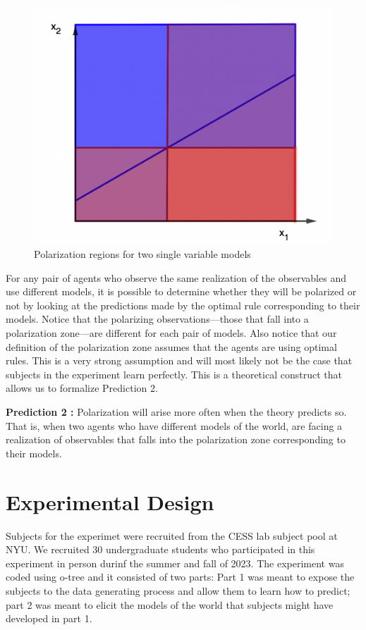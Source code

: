 \documentclass[
  12pt,
]{article}
\begin{document}
\begin{figure}

{\centering \includegraphics[width=0.5\linewidth]{../diagram_polariazation_2variables} 

}

\caption{\label{example} Polarization regions for two single variable models}\label{fig:example}
\end{figure}

For any pair of agents who observe the same realization of the
observables and use different models, it is possible to determine
whether they will be polarized or not by looking at the predictions made
by the optimal rule corresponding to their models. Notice that the
polarizing observations---those that fall into a polarization zone---are
different for each pair of models. Also notice that our definition of
the polarization zone assumes that the agents are using optimal rules.
This is a very strong assumption and will most likely not be the case
that subjects in the experiment learn perfectly. This is a theoretical
construct that allows us to formalize Prediction 2.

\textbf{Prediction 2 :} Polarization will arise more often when the
theory predicts so. That is, when two agents who have different models
of the world, are facing a realization of observables that falls into
the polarization zone corresponding to their models.

\hypertarget{experimental-design}{%
\section{Experimental Design}\label{experimental-design}}

Subjects for the experimet were recruited from the CESS lab subject pool
at NYU. We recruited 30 undergraduate students who participated in this
experiment in person durinf the summer and fall of 2023. The experiment
was coded using o-tree \citet{otree} and it consisted of two parts: Part
1 was meant to expose the subjects to the data generating process and
allow them to learn how to predict; part 2 was meant to elicit the
models of the world that subjects might have developed in part 1.
\end{document}
